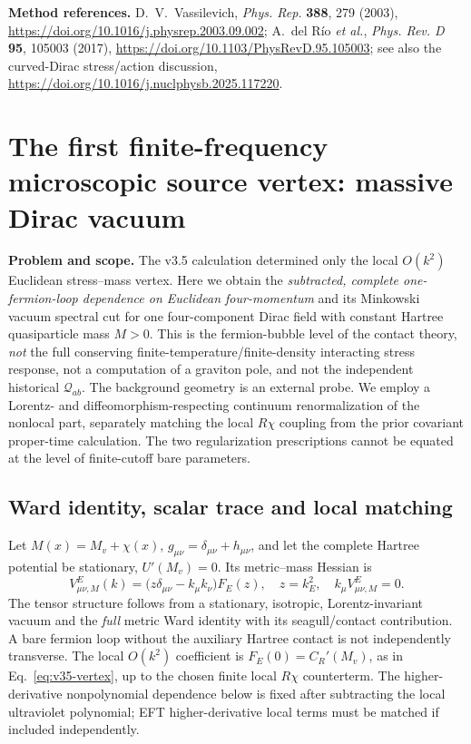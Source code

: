 \documentclass[11pt,a4paper]{article}
\theoremstyle{remark}\newtheorem{remark}[theorem]{Remark}
\begin{document}
\smallskip\noindent\textbf{Method references.} D.~V.~Vassilevich, \emph{Phys. Rep.} \textbf{388}, 279 (2003), \url{https://doi.org/10.1016/j.physrep.2003.09.002}; A.~del R{\'i}o \emph{et al.}, \emph{Phys. Rev. D} \textbf{95}, 105003 (2017), \url{https://doi.org/10.1103/PhysRevD.95.105003}; see also the curved-Dirac stress/action discussion, \url{https://doi.org/10.1016/j.nuclphysb.2025.117220}.


\clearpage
\section{The first finite-frequency microscopic source vertex: massive Dirac vacuum}
\label{sec:v36-fullvertex}
\textbf{Problem and scope.} The v3.5 calculation determined only the local $O(k^2)$ Euclidean stress--mass vertex. Here we obtain the \emph{subtracted, complete one-fermion-loop dependence on Euclidean four-momentum} and its Minkowski vacuum spectral cut for one four-component Dirac field with constant Hartree quasiparticle mass $M>0$. This is the fermion-bubble level of the contact theory, \emph{not} the full conserving finite-temperature/finite-density interacting stress response, not a computation of a graviton pole, and not the independent historical $\mathcal Q_{ab}$. The background geometry is an external probe. We employ a Lorentz- and diffeomorphism-respecting continuum renormalization of the nonlocal part, separately matching the local $R\chi$ coupling from the prior covariant proper-time calculation. The two regularization prescriptions cannot be equated at the level of finite-cutoff bare parameters.

\subsection{Ward identity, scalar trace and local matching}
Let $M(x)=M_v+\chi(x)$, $g_{\mu\nu}=\delta_{\mu\nu}+h_{\mu\nu}$, and let the complete Hartree potential be stationary, $U'(M_v)=0$. Its metric--mass Hessian is
\begin{equation}\label{eq:v36-transverse}
\boxed{V^E_{\mu\nu,M}(k)=\bigl(z\delta_{\mu\nu}-k_\mu k_\nu\bigr)F_E(z),\quad z=k_E^2,\quad k_\mu V^E_{\mu\nu,M}=0.}
\end{equation}
The tensor structure follows from a stationary, isotropic, Lorentz-invariant vacuum and the \emph{full} metric Ward identity with its seagull/contact contribution. A bare fermion loop without the auxiliary Hartree contact is not independently transverse. The local $O(k^2)$ coefficient is $F_E(0)=C_R'(M_v)$, as in Eq.~\eqref{eq:v35-vertex}, up to the chosen finite local $R\chi$ counterterm. The higher-derivative nonpolynomial dependence below is fixed after subtracting the local ultraviolet polynomial; EFT higher-derivative local terms must be matched if included independently.
\end{document}
